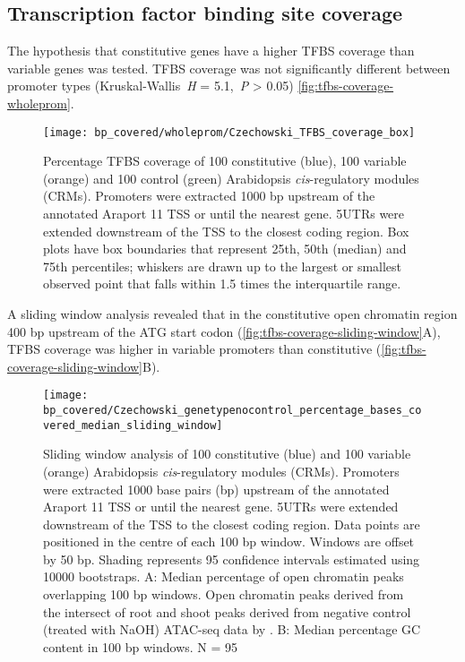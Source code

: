 \documentclass[../main.tex]{subfiles}
\begin{document}
\subsection{Transcription factor binding site coverage}
The hypothesis that constitutive genes have a higher TFBS coverage than variable genes was tested.
TFBS coverage was not significantly different between promoter types (Kruskal\hyp{}Wallis~\textit{H} = 5.1,~\textit{P} \textgreater{} 0.05) \autoref{fig:tfbs-coverage-wholeprom}.

\begin{figure}[hbt!]
	\begin{center}
		\capstart
		\texttt{[image: bp\_covered/wholeprom/Czechowski\_TFBS\_coverage\_box]}
		\caption{
			Percentage TFBS coverage of 100 constitutive (blue), 100 variable (orange) and 100 control (green) Arabidopsis \textit{cis}\hyp{}regulatory modules (CRMs).
			Promoters were extracted 1000 bp upstream of the annotated Araport 11 \autocite{chengAraport11CompleteReannotation2017} TSS or until the nearest gene.
			5UTRs were extended downstream of the TSS to the closest coding region.  Box plots have box boundaries that represent 25th, 50th (median) and 75th percentiles; whiskers are drawn up to the largest or smallest observed point that falls within 1.5 times the interquartile range.		
			\label{fig:tfbs-coverage-wholeprom}
		}
	\end{center}
\end{figure}

A sliding window analysis revealed that in the constitutive open chromatin region 400 bp upstream of the ATG start codon (\autoref{fig:tfbs-coverage-sliding-window}A), TFBS coverage was higher in variable promoters than constitutive (\autoref{fig:tfbs-coverage-sliding-window}B).

 \begin{figure}[hbt!]
	\begin{center}
		\capstart
		\texttt{[image: bp\_covered/Czechowski\_genetypenocontrol\_percentage\_bases\_covered\_median\_sliding\_window]}
		\caption{
			Sliding window analysis of 100 constitutive (blue) and 100 variable (orange) Arabidopsis \textit{cis}\hyp{}regulatory modules (CRMs).
			Promoters were extracted 1000 base pairs (bp) upstream of the annotated Araport 11 \autocite{chengAraport11CompleteReannotation2017} TSS or until the nearest gene.
			5UTRs were extended downstream of the TSS to the closest coding region.
			Data points are positioned in the centre of each 100 bp window.
			Windows are offset by 50 bp.
			Shading represents 95 confidence intervals estimated using 10000 bootstraps.
			A: Median percentage of open chromatin peaks overlapping 100 bp windows. Open chromatin peaks derived from the intersect of root and shoot peaks derived from negative control (treated with NaOH) ATAC\hyp{}seq data by \textcite{potterCytokininModulatesContextdependent2018}.	
			B: Median percentage GC content in 100 bp windows. N = 95
			\label{fig:tfbs-coverage-sliding-window}
		}
	\end{center}
\end{figure}
\end{document}
